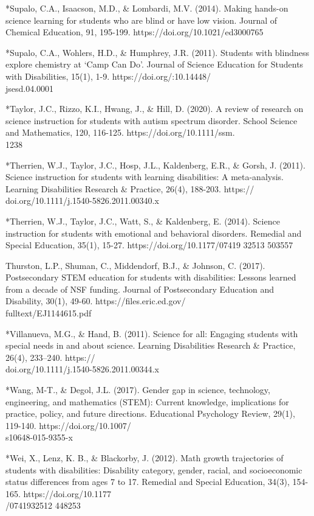 \documentclass[11pt]{sig-alternate}
\begin{document}
\begin{large}
*Supalo, C.A., Isaacson, M.D., \& Lombardi, M.V. (2014). Making hands-on science learning for students who are blind or have low vision. Journal of Chemical Education, 91, 195-199. 
	https://doi.org/10.1021/ed3000765

*Supalo, C.A., Wohlers, H.D., \& Humphrey, J.R. (2011). Students with blindness explore 
chemistry at ‘Camp Can Do’. Journal of Science Education for Students with Disabilities, 15(1), 1-9. https://doi.org/:10.14448/\\jsesd.04.0001

*Taylor, J.C., Rizzo, K.I., Hwang, J., \& Hill, D. (2020). A review of research on science instruction for students with autism spectrum disorder. School Science and Mathematics, 120, 116-125. https://doi.org/10.1111/ssm.\\1238

*Therrien, W.J., Taylor, J.C., Hosp, J.L., Kaldenberg, E.R., \& Gorsh, J. (2011). Science instruction for students with learning disabilities: A meta-analysis. Learning Disabilities Research \& Practice, 26(4), 188-203. https://\\doi.org/10.1111/j.1540-5826.2011.00340.x

*Therrien, W.J., Taylor, J.C., Watt, S., \& Kaldenberg, E. (2014). Science instruction for students with emotional and behavioral disorders. Remedial and Special Education, 35(1), 15-27. https://doi.org/10.1177/07419 32513 503557

Thurston, L.P., Shuman, C., Middendorf, B.J., \& Johnson, C. (2017). Postsecondary STEM education for students with disabilities: Lessons learned from a decade of NSF funding. Journal of Postsecondary Education and Disability, 30(1), 49-60. 
	https://files.eric.ed.gov/\\fulltext/EJ1144615.pdf

*Villanueva, M.G., \& Hand, B. (2011). Science for all: Engaging students with special needs in and about science. Learning Disabilities Research \& Practice, 26(4), 233–240. 
	https://\\doi.org/10.1111/j.1540-5826.2011.00344.x

*Wang, M-T., \& Degol, J.L. (2017). Gender gap in science, technology, engineering, and mathematics (STEM): Current knowledge, implications for practice, policy, and future directions. Educational Psychology Review, 29(1), 119-140. 
https://doi.org/10.1007/\\s10648-015-9355-x

*Wei, X., Lenz, K. B., \& Blackorby, J. (2012). Math growth trajectories of students with disabilities: Disability category, gender, racial, and socioeconomic status differences from ages 7 to 17. Remedial and Special Education, 34(3), 154-165.  https://doi.org/10.1177\\/0741932512 448253


\end{large}
\end{document}
